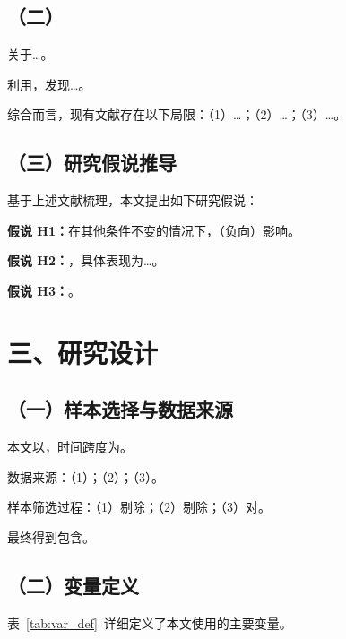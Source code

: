 \documentclass[lang=cn, aaffiliation={中国}]{ctexart}
\begin{document}
\subsection{（二）}
\label{sec:lit:topic2}

关于\dots。

\citet{vvv}利用，发现\dots。

综合而言，现有文献存在以下局限：（1）\dots；（2）\dots；（3）\dots。

\subsection{（三）研究假说推导}
\label{sec:hypothesis}

基于上述文献梳理，本文提出如下研究假说：

\textbf{假说 H1：}在其他条件不变的情况下，（负向）影响。

\textbf{假说 H2：}，具体表现为\dots。

\textbf{假说 H3：}。

\section{三、研究设计}
\label{sec:design}

\subsection{（一）样本选择与数据来源}
\label{sec:data}

本文以，时间跨度为。

数据来源：（1）；（2）；（3）。

样本筛选过程：（1）剔除；（2）剔除；（3）对。

最终得到包含。

\subsection{（二）变量定义}
\label{sec:var}

表~\ref{tab:var_def}~详细定义了本文使用的主要变量。
\end{document}
